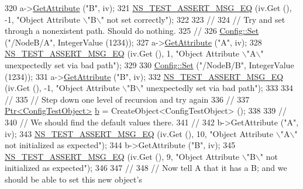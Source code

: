\begin{DoxyCode}
320   a->\hyperlink{classns3_1_1ObjectBase_a895d1de2f96063d0e0fd78463e7a7e30}{GetAttribute} (\textcolor{stringliteral}{"B"}, iv);
321   \hyperlink{group__testing_ga2a9d78cffb3db8e867c35fff0b698cf5}{NS\_TEST\_ASSERT\_MSG\_EQ} (iv.Get (), -1, \textcolor{stringliteral}{"Object Attribute \(\backslash\)"B\(\backslash\)" not set correctly"});
322 
323   \textcolor{comment}{//}
324   \textcolor{comment}{// Try and set through a nonexistent path.  Should do nothing.}
325   \textcolor{comment}{//}
326   \hyperlink{group__config_gadce03667ec621d64ce4aace85d9bcfd0}{Config::Set} (\textcolor{stringliteral}{"/NodeB/A"}, IntegerValue (1234));
327   a->\hyperlink{classns3_1_1ObjectBase_a895d1de2f96063d0e0fd78463e7a7e30}{GetAttribute} (\textcolor{stringliteral}{"A"}, iv);
328   \hyperlink{group__testing_ga2a9d78cffb3db8e867c35fff0b698cf5}{NS\_TEST\_ASSERT\_MSG\_EQ} (iv.Get (), 1, \textcolor{stringliteral}{"Object Attribute \(\backslash\)"A\(\backslash\)" unexpectedly set via
       bad path"});
329 
330   \hyperlink{group__config_gadce03667ec621d64ce4aace85d9bcfd0}{Config::Set} (\textcolor{stringliteral}{"/NodeB/B"}, IntegerValue (1234));
331   a->\hyperlink{classns3_1_1ObjectBase_a895d1de2f96063d0e0fd78463e7a7e30}{GetAttribute} (\textcolor{stringliteral}{"B"}, iv);
332   \hyperlink{group__testing_ga2a9d78cffb3db8e867c35fff0b698cf5}{NS\_TEST\_ASSERT\_MSG\_EQ} (iv.Get (), -1, \textcolor{stringliteral}{"Object Attribute \(\backslash\)"B\(\backslash\)" unexpectedly set via
       bad path"});
333 
334   \textcolor{comment}{//}
335   \textcolor{comment}{// Step down one level of recursion and try again}
336   \textcolor{comment}{//}
337   \hyperlink{classns3_1_1Ptr}{Ptr<ConfigTestObject>} \hyperlink{buildings__pathloss_8m_a21ad0bd836b90d08f4cf640b4c298e7c}{b} = CreateObject<ConfigTestObject> ();
338 
339   \textcolor{comment}{//}
340   \textcolor{comment}{// We should find the default values there.}
341   \textcolor{comment}{//}
342   b->GetAttribute (\textcolor{stringliteral}{"A"}, iv);
343   \hyperlink{group__testing_ga2a9d78cffb3db8e867c35fff0b698cf5}{NS\_TEST\_ASSERT\_MSG\_EQ} (iv.Get (), 10, \textcolor{stringliteral}{"Object Attribute \(\backslash\)"A\(\backslash\)" not initialized as
       expected"});
344   b->GetAttribute (\textcolor{stringliteral}{"B"}, iv);
345   \hyperlink{group__testing_ga2a9d78cffb3db8e867c35fff0b698cf5}{NS\_TEST\_ASSERT\_MSG\_EQ} (iv.Get (), 9, \textcolor{stringliteral}{"Object Attribute \(\backslash\)"B\(\backslash\)" not initialized as
       expected"});
346 
347   \textcolor{comment}{//}
348   \textcolor{comment}{// Now tell A that it has a B; and we should be able to set this new object's}

\end{DoxyCode}
